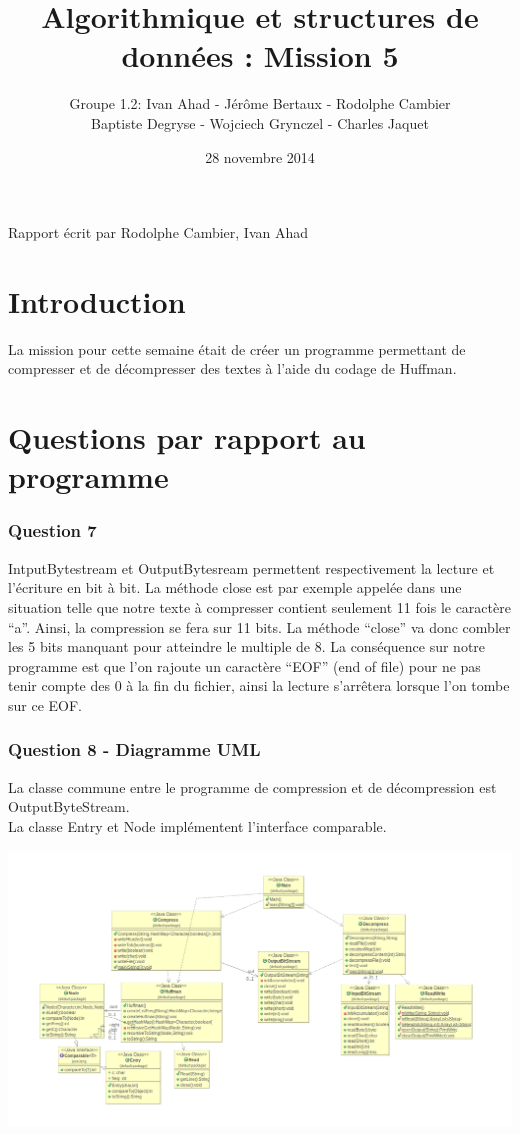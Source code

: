 \documentclass[a4paper]{article}
\title{Algorithmique et structures de données : Mission 5}
\date{28 novembre 2014}
\author{Groupe 1.2: Ivan Ahad - Jérôme Bertaux - Rodolphe Cambier \\ 
	Baptiste Degryse - Wojciech Grynczel - Charles Jaquet}
\begin{document}
\maketitle


Rapport écrit par Rodolphe Cambier, Ivan Ahad
\section*{Introduction}
La mission pour cette semaine était de créer un programme permettant de compresser et de décompresser des textes à l'aide du codage de Huffman. 

\section*{Questions par rapport au programme}

\subsubsection*{Question 7}

IntputBytestream et OutputBytesream permettent respectivement la lecture et l’écriture en bit à bit.
La méthode close est par exemple appelée dans une situation telle que notre texte à compresser contient seulement 11 fois le caractère “a”. Ainsi, la compression se fera sur 11 bits. La méthode “close” va donc combler les 5 bits manquant pour atteindre le multiple de 8. La conséquence sur notre programme est que l’on rajoute un caractère “EOF” (end of file) pour ne pas tenir compte des 0 à la fin du fichier, ainsi la lecture s’arrêtera lorsque l’on tombe sur ce EOF. 


\subsubsection*{Question 8 - Diagramme UML}

La classe commune entre le programme de compression et de décompression est OutputByteStream. 
\\
La classe Entry et Node implémentent l'interface comparable. 

\includegraphics[scale=0.45]{UML.png}
\end{document}
